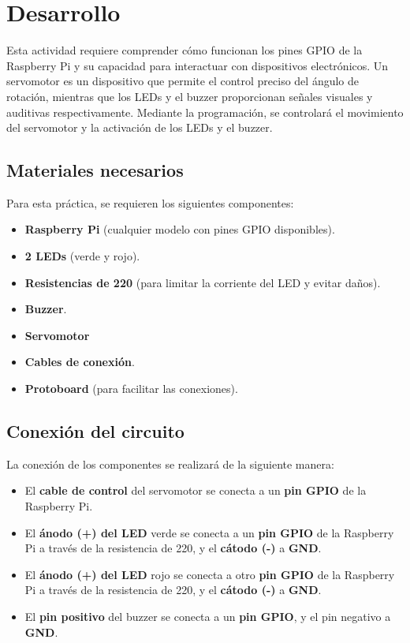\section{Desarrollo}
Esta actividad requiere comprender cómo funcionan los pines GPIO de la Raspberry Pi y su capacidad para interactuar con dispositivos electrónicos. Un servomotor es un dispositivo que permite el control preciso del ángulo de rotación, mientras que los LEDs y el buzzer proporcionan señales visuales y auditivas respectivamente. Mediante la programación, se controlará el movimiento del servomotor y la activación de los LEDs y el buzzer.

\subsection{Materiales necesarios}
Para esta práctica, se requieren los siguientes componentes:
\begin{itemize}
	\item \textbf{Raspberry Pi} (cualquier modelo con pines GPIO disponibles).
	\item \textbf{2 LEDs} (verde y rojo).
	\item \textbf{Resistencias de 220\textohm} (para limitar la corriente del LED y evitar daños).
	\item \textbf{Buzzer}.
	\item\textbf{Servomotor}
	\item \textbf{Cables de conexión}.
	\item \textbf{Protoboard} (para facilitar las conexiones).
\end{itemize}

\subsection{Conexión del circuito}
La conexión de los componentes se realizará de la siguiente manera:
\begin{itemize}
	\item El \textbf{cable de control} del servomotor se conecta a un \textbf{pin GPIO} de la Raspberry Pi. 
	\item El \textbf{ánodo (+) del LED} verde se conecta a un \textbf{pin GPIO} de la Raspberry Pi a través de la resistencia de 220\textohm, y el \textbf{cátodo (-)} a \textbf{GND}.
	\item El \textbf{ánodo (+) del LED} rojo se conecta a otro \textbf{pin GPIO} de la Raspberry Pi a través de la resistencia de 220\textohm, y el \textbf{cátodo (-)} a \textbf{GND}.
	\item El \textbf{pin positivo} del buzzer se conecta a un \textbf{pin GPIO}, y el pin negativo a \textbf{GND}.
\end{itemize}

